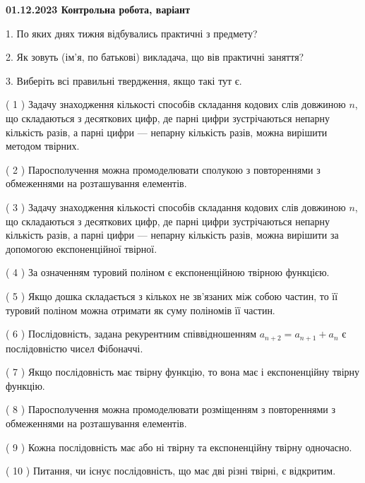 \documentclass[12pt, ukrainian]{article}
\begin{document}
\vspace{4mm}
\newpage
\begin {large}

\textbf{01.12.2023 Контрольна робота, варіант  }\par


{
1. По яких днях тижня відбувались практичні з предмету?



\vspace{5mm}
2. Як зовуть (ім'я, по батькові) викладача, що вів практичні заняття?



\vspace{5mm}
3. Виберіть всі правильні твердження, якщо такі тут є.\par
\vspace{2mm}
( 1 ) Задачу знаходження кількості способів складання кодових слів довжиною $n$, що складаються з десяткових цифр, де парні цифри зустрічаються непарну кількість разів, а парні цифри — непарну кількість разів, можна вирішити методом твірних.%

( 2 ) Паросполучення можна промоделювати сполукою з повтореннями з обмеженнями на розташування елементів.%

( 3 ) Задачу знаходження кількості способів складання кодових слів довжиною $n$, що складаються з десяткових цифр, де парні цифри зустрічаються непарну кількість разів, а парні цифри — непарну кількість разів, можна вирішити за допомогою експоненційної твірної.%

( 4 ) За означенням туровий поліном є експоненційною твірною функцією.%

( 5 ) Якщо дошка складається з кількох не зв’язаних між собою частин, то її туровий поліном можна отримати як суму поліномів її частин.%

( 6 ) Послідовність, задана рекурентним співвідношенням $a_{n+2}=a_{n+1}+a_{n}$ є послідовністю чисел Фібоначчі.%

( 7 ) Якщо послідовність має твірну функцію, то вона має і експоненційну твірну функцію.%

( 8 ) Паросполучення можна промоделювати розміщенням з повтореннями з обмеженнями на розташування елементів.%

( 9 ) Кожна послідовність має або ні твірну та експоненційну твірну одночасно.%

( 10 ) Питання, чи існує послідовність, що має дві різні твірні, є відкритим.%
}
\end {large}
\end{document}
